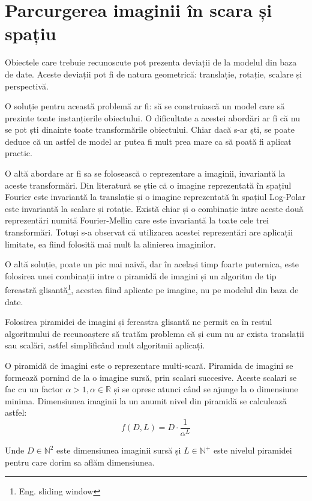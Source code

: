 \pagebreak
\section{Parcurgerea imaginii în scara și spațiu}

Obiectele care trebuie recunoscute pot prezenta deviații de la modelul din baza de date.
Aceste deviații pot fi de natura geometrică: translație, rotație, scalare și perspectivă.

O soluție pentru această problemă ar fi: să se construiască un model care să prezinte toate instanțierile obiectului.
O dificultate a acestei abordări ar fi că nu se pot ști dinainte toate transformările obiectului.
Chiar dacă s-ar ști, se poate deduce că un astfel de model ar putea fi mult prea mare ca să poată fi aplicat practic.

O altă abordare ar fi sa se folosească o reprezentare a imaginii, invariantă la aceste transformări.
Din literatură se știe că o imagine reprezentată în spațiul Fourier este invariantă la translație și o imagine reprezentată în spațiul Log-Polar este invariantă la scalare și rotație\cite{treiber2010introduction}.
Există chiar și o combinație intre aceste două reprezentări numită Fourier-Mellin care este invariantă la toate cele trei transformări.
Totuși s-a observat că utilizarea acestei reprezentări are aplicații limitate, ea fiind folosită mai mult la alinierea imaginilor\cite{treiber2010introduction}.

O altă soluție, poate un pic mai naivă, dar în același timp foarte puternica, este folosirea unei combinații intre o piramidă de imagini și un algoritm de tip fereastră glisantă\footnote{Eng. sliding window}, acestea fiind aplicate pe imagine, nu pe modelul din baza de date.

Folosirea piramidei de imagini și fereastra glisantă ne permit ca în restul algoritmului de recunoaștere să tratăm problema că și cum nu ar exista translații sau scalări, astfel simplificând mult algoritmii aplicați.

O piramidă de imagini este o reprezentare multi-scară.
Piramida de imagini se formează pornind de la o imagine sursă, prin scalari succesive.
Aceste scalari se fac cu un factor ${\alpha > 1, \alpha \in \mathbb{R}}$ și se opresc atunci când se ajunge la o dimensiune minima.
Dimensiunea imaginii la un anumit nivel din piramidă se calculează astfel:
$${
f(D,L) = D \cdot \frac{1}{\alpha^L}
}$$

Unde ${D \in \mathbb{N}^2}$ este dimensiunea imaginii sursă și ${L \in \mathbb{N}^+}$ este nivelul piramidei pentru care dorim sa aflăm dimensiunea.


